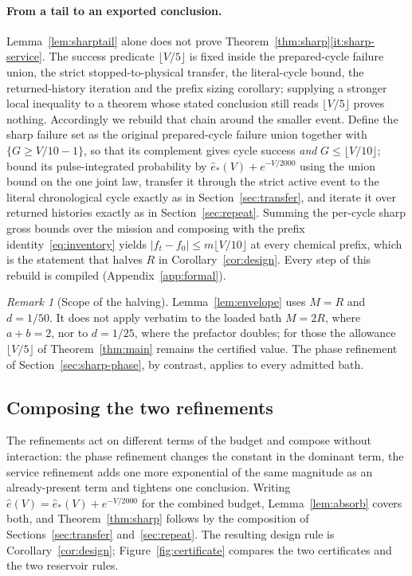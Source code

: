 \documentclass[11pt,a4paper]{article}
\theoremstyle{plain}
\theoremstyle{definition}
\theoremstyle{remark}
\newtheorem{remark}[theorem]{Remark}
\begin{document}
\paragraph{From a tail to an exported conclusion.}
Lemma~\ref{lem:sharptail} alone does not prove Theorem~\ref{thm:sharp}\ref{it:sharp-service}. The success predicate $\lfloor V/5\rfloor$ is fixed inside the prepared-cycle failure union, the strict stopped-to-physical transfer, the literal-cycle bound, the returned-history iteration and the prefix sizing corollary; supplying a stronger local inequality to a theorem whose stated conclusion still reads $\lfloor V/5\rfloor$ proves nothing. Accordingly we rebuild that chain around the smaller event. Define the sharp failure set as the original prepared-cycle failure union together with $\{G\ge V/10-1\}$, so that its complement gives cycle success \emph{and} $G\le\lfloor V/10\rfloor$; bound its pulse-integrated probability by $\widehat e_\ast(V)+e^{-V/2000}$ using the union bound on the one joint law, transfer it through the strict active event to the literal chronological cycle exactly as in Section~\ref{sec:transfer}, and iterate it over returned histories exactly as in Section~\ref{sec:repeat}. Summing the per-cycle sharp gross bounds over the mission and composing with the prefix identity~\eqref{eq:inventory} yields $|f_t-f_0|\le m\lfloor V/10\rfloor$ at every chemical prefix, which is the statement that halves $R$ in Corollary~\ref{cor:design}. Every step of this rebuild is compiled (Appendix~\ref{app:formal}).

\begin{remark}[Scope of the halving]\label{rem:halvescope}
Lemma~\ref{lem:envelope} uses $M=R$ and $d=1/50$. It does not apply verbatim to the loaded bath $M=2R$, where $a+b=2$, nor to $d=1/25$, where the prefactor doubles; for those the allowance $\lfloor V/5\rfloor$ of Theorem~\ref{thm:main} remains the certified value. The phase refinement of Section~\ref{sec:sharp-phase}, by contrast, applies to every admitted bath.
\end{remark}

\subsection{Composing the two refinements}\label{sec:sharp-compose}

The refinements act on different terms of the budget and compose without interaction: the phase refinement changes the constant in the dominant term, the service refinement adds one more exponential of the same magnitude as an already-present term and tightens one conclusion. Writing $\widehat e(V)=\widehat e_\ast(V)+e^{-V/2000}$ for the combined budget, Lemma~\ref{lem:absorb} covers both, and Theorem~\ref{thm:sharp} follows by the composition of Sections~\ref{sec:transfer} and~\ref{sec:repeat}. The resulting design rule is Corollary~\ref{cor:design}; Figure~\ref{fig:certificate} compares the two certificates and the two reservoir rules.
\end{document}
